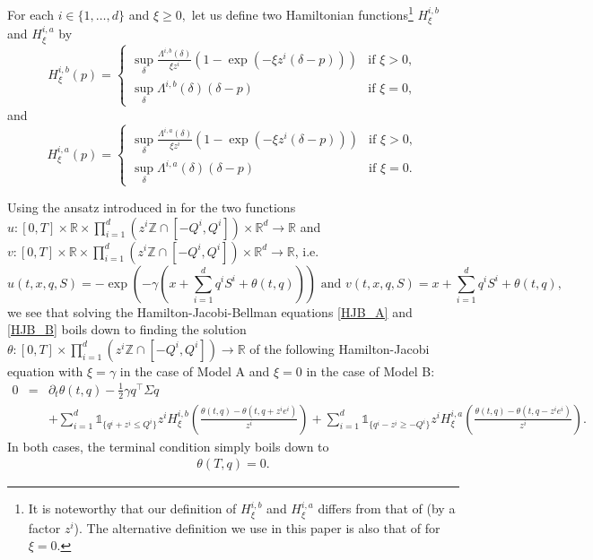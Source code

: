 \documentclass[preprint, 3p]{elsarticle}
\newcommand{\1}{{\chi}}
\begin{document}
For each $i \in \{1,\ldots, d\}$ and $\xi \ge 0,$ let us define two Hamiltonian functions\footnote{It is noteworthy that our definition of $H_\xi^{i,b}$ and $H_\xi^{i,a}$
differs from that of \cite{gueant2017optimal} (by a factor $z^i$). The
alternative definition we use in this paper is also that of \cite{bergault2019size} for $\xi=0$.}
$H_\xi^{i,b}$ and $H_\xi^{i,a}$ by
\begin{equation} \label{eq:Hb}
H^{i,b}_\xi(p)=
\begin{cases}
	\underset{\delta}{\sup}\frac{\Lambda^{i,b}(\delta)}{\xi z^i}(1-\exp(-\xi z^i(\delta-p)))&\mbox{if } \xi>0,\\
	\underset{\delta}{\sup}\Lambda^{i,b}(\delta)(\delta-p)&\mbox{if }\xi=0,
\end{cases}
\end{equation}
and
\begin{equation} \label{eq:Ha}
H^{i,a}_\xi(p)=
\begin{cases}
	\underset{\delta}{\sup}\frac{\Lambda^{i,a}(\delta)}{\xi z^i}(1-\exp(-\xi z^i(\delta-p)))&\mbox{if } \xi>0,\\
	\underset{\delta}{\sup}\Lambda^{i,a}(\delta)(\delta-p)&\mbox{if }\xi=0.
\end{cases}
\end{equation}

Using the ansatz introduced in \cite{gueant2017optimal} for the two functions $u: [0,T] \times \mathbb R \times \prod_{i=1}^d \left(z^i \mathbb Z \cap [-Q^i, Q^i]\right) \times \mathbb R^d \rightarrow \mathbb R$ and $v: [0,T] \times \mathbb R \times \prod_{i=1}^d \left(z^i \mathbb Z \cap [-Q^i, Q^i]\right) \times \mathbb R^d \rightarrow \mathbb R$, i.e.
    $$u(t,x,q,S) = - \exp \left(-\gamma  \left( x + \sum_{i=1}^d q^iS^i + \theta(t,q) \right) \right) \text{ and } v(t,x,q,S) = x + \sum_{i=1}^d q^iS^i + \theta(t,q),$$
we see that solving the Hamilton-Jacobi-Bellman equations \eqref{HJB_A} and \eqref{HJB_B} boils down to finding the solution $\theta : [0,T] \times \prod_{i=1}^d \left(z^i \mathbb Z \cap [-Q^i, Q^i]\right) \to \mathbb R$ of the following Hamilton-Jacobi equation with $\xi = \gamma$ in the case of Model A and $\xi =0$ in the case of Model B:
\begin{eqnarray}
    \label{sec2:thetagen}
    0 &=& \partial_t \theta(t,q) - \frac 12 \gamma q^\intercal \Sigma q\\
    &&+ \sum_{i=1}^d \mathds{1}_{\{q^i + z^i \le Q^i\}} z^i H^{i,b}_\xi \left( \frac{\theta(t,q) - \theta(t,q+z^ie^i)}{z^i} \right) + \sum_{i=1}^d \mathds{1}_{\{q^i - z^i \ge - Q^i\}} z^i H^{i,a}_\xi \left( \frac{\theta(t,q) - \theta(t,q-z^ie^i)}{z^i} \right).  \nonumber
\end{eqnarray}
In both cases, the terminal condition simply boils down to
\begin{align}
    \label{sec2:thetagenCT}
    \theta(T,q) = 0.
\end{align}
\end{document}
